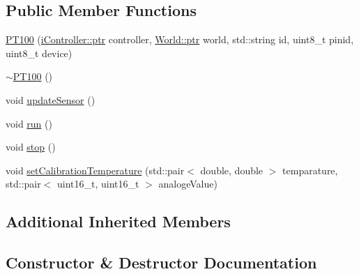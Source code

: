 \subsection*{Public Member Functions}
\begin{DoxyCompactItemize}
\item 
\hyperlink{classo_cpt_1_1components_1_1sensors_1_1_p_t100_aedb71224bcffefd6d43ee72458344826}{P\+T100} (\hyperlink{classo_cpt_1_1i_controller_a6d89a95cd6ad68bb74adfaca2f36370f}{i\+Controller\+::ptr} controller, \hyperlink{classo_cpt_1_1_world_aa6e591e3096d5de71e0cec9039663d67}{World\+::ptr} world, std\+::string id, uint8\+\_\+t pinid, uint8\+\_\+t device)
\item 
\hyperlink{classo_cpt_1_1components_1_1sensors_1_1_p_t100_aa6fcce0276d47e75a16f153962c57b8c}{$\sim$\+P\+T100} ()
\item 
void \hyperlink{classo_cpt_1_1components_1_1sensors_1_1_p_t100_a66619675288a5344a55242d9bf097aee}{update\+Sensor} ()
\item 
void \hyperlink{classo_cpt_1_1components_1_1sensors_1_1_p_t100_a41dfc55a4be7993949feeb5ac013690d}{run} ()
\item 
void \hyperlink{classo_cpt_1_1components_1_1sensors_1_1_p_t100_a6d80e18a58cf4e1b9b6ce82b441209e2}{stop} ()
\item 
void \hyperlink{classo_cpt_1_1components_1_1sensors_1_1_p_t100_a77e36b92c5eb4b6594fa89114d0fb357}{set\+Calibration\+Temperature} (std\+::pair$<$ double, double $>$ temparature, std\+::pair$<$ uint16\+\_\+t, uint16\+\_\+t $>$ analoge\+Value)
\end{DoxyCompactItemize}
\subsection*{Additional Inherited Members}


\subsection{Constructor \& Destructor Documentation}
